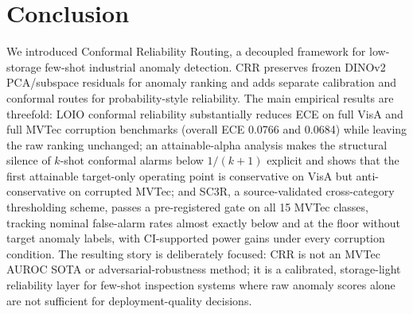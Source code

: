 \section{Conclusion}
We introduced Conformal Reliability Routing, a decoupled framework for low-storage few-shot industrial anomaly detection. CRR preserves frozen DINOv2 PCA/subspace residuals for anomaly ranking and adds separate calibration and conformal routes for probability-style reliability. The main empirical results are threefold: LOIO conformal reliability substantially reduces ECE on full VisA and full MVTec corruption benchmarks (overall ECE 0.0766 and 0.0684) while leaving the raw ranking unchanged; an attainable-alpha analysis makes the structural silence of $k$-shot conformal alarms below $1/(k{+}1)$ explicit and shows that the first attainable target-only operating point is conservative on VisA but anti-conservative on corrupted MVTec; and SC3R, a source-validated cross-category thresholding scheme, passes a pre-registered gate on all 15 MVTec classes, tracking nominal false-alarm rates almost exactly below and at the floor without target anomaly labels, with CI-supported power gains under every corruption condition. The resulting story is deliberately focused: CRR is not an MVTec AUROC SOTA or adversarial-robustness method; it is a calibrated, storage-light reliability layer for few-shot inspection systems where raw anomaly scores alone are not sufficient for deployment-quality decisions.
